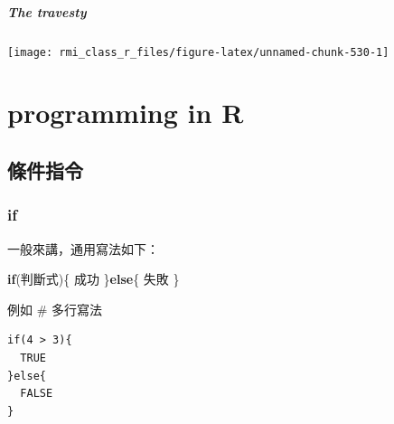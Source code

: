 \documentclass[]{book}
\newenvironment{Shaded}{\begin{snugshade}}{\end{snugshade}}
\newcommand{\ControlFlowTok}[1]{\textcolor[rgb]{0.13,0.29,0.53}{\textbf{#1}}}
\newcommand{\DataTypeTok}[1]{\textcolor[rgb]{0.13,0.29,0.53}{#1}}
\newcommand{\KeywordTok}[1]{\textcolor[rgb]{0.13,0.29,0.53}{\textbf{#1}}}
\newcommand{\NormalTok}[1]{#1}
\newcommand{\OperatorTok}[1]{\textcolor[rgb]{0.81,0.36,0.00}{\textbf{#1}}}
\newcommand{\StringTok}[1]{\textcolor[rgb]{0.31,0.60,0.02}{#1}}
\let\oldparagraph\paragraph
\renewcommand{\paragraph}[1]{\oldparagraph{#1}\mbox{}}
\theoremstyle{definition}
\theoremstyle{definition}
\theoremstyle{definition}
\theoremstyle{remark}
\begin{document}
\hypertarget{the-travesty}{%
\paragraph{The travesty}\label{the-travesty}}

\begin{Shaded}
\end{Shaded}

\begin{center}\texttt{[image: rmi\_class\_r\_files/figure-latex/unnamed-chunk-530-1]} \end{center}

\hypertarget{programming-in-r}{%
\chapter{programming in R}\label{programming-in-r}}

\section{條件指令}

\hypertarget{if}{%
\subsection{if}\label{if}}

一般來講，通用寫法如下：

\begin{Shaded}
\begin{Highlighting}[]
\ControlFlowTok{if}\NormalTok{(判斷式)\{}
\NormalTok{ 成功}
\NormalTok{\}}\ControlFlowTok{else}\NormalTok{\{}
\NormalTok{ 失敗}
\NormalTok{\}}
\end{Highlighting}
\end{Shaded}

例如 \# 多行寫法

\begin{verbatim}
if(4 > 3){
  TRUE
}else{
  FALSE
}
\end{verbatim}
\end{document}
